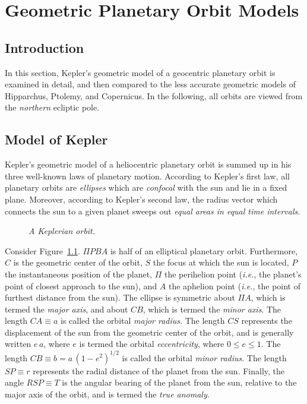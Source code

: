 \chapter{Geometric Planetary Orbit Models}\label{ckep}
\section{Introduction}
In this section, 
 Kepler's geometric model of  a geocentric planetary orbit is  examined in detail, and then compared to the 
less accurate geometric models of Hipparchus, Ptolemy, and Copernicus. In the following,
all orbits are viewed from the {\em northern}\/ ecliptic pole.

\section{Model of Kepler}
Kepler's geometric model of a heliocentric planetary orbit is summed up in his   three well-known laws of planetary motion.
According to Kepler's first law, all planetary orbits are {\em ellipses}\/  which are {\em confocal}\/ with the sun and lie in a
fixed plane.
Moreover, according to Kepler's second law, the radius vector which connects the sun to a given planet sweeps out {\em equal areas in equal time intervals}. 

\begin{figure}[h]
\epsfysize=2.5in
\centerline{}
\caption{\em A Keplerian orbit.}\label{jf1}
\end{figure}

Consider Figure~\ref{jf1}. $\Pi PBA$ is half  of an elliptical planetary orbit. Furthermore, $C$ is the
geometric center of the orbit, $S$ the focus at which the sun is located,
$P$ the instantaneous position of the planet, $\Pi$ the perihelion point ({\em i.e.}, the planet's point of closest approach to the sun),
and $A$ the aphelion point ({\em i.e.}, the  point of furthest distance from the sun). The ellipse is symmetric about
$\Pi A$, which is termed the {\em major axis}, and about $CB$,
which is termed the {\em minor axis}.
The length $CA\equiv a$ is called the orbital
{\em major radius}. The length $CS$  represents the displacement of the sun from
the geometric center of the orbit, and is generally written $e\,a$, where $e$ is termed the
orbital {\em eccentricity}, where $0\leq e\leq 1$. The length $CB\equiv b = a\,(1-e^2)^{1/2}$ is called
the orbital {\em minor radius}. 
The length $SP\equiv r$ represents the radial distance of the planet from the sun.
Finally, the angle $RSP\equiv T$ is the angular bearing of the planet from the sun,
relative to the major axis of the orbit, and is termed the {\em true anomaly}. 

